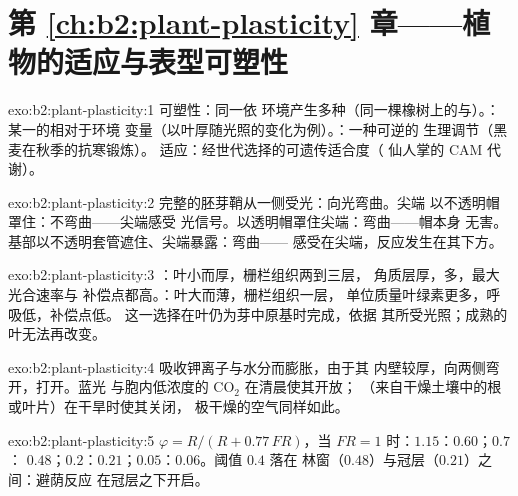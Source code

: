 \section*{第 \ref{ch:b2:plant-plasticity} 章——植物的适应与表型可塑性}

\begin{solution}{exo:b2:plant-plasticity:1}
可塑性：同一依
环境产生多种（同一棵橡树上的与）。：
某一的相对于环境
变量（以叶厚随光照的变化为例）。：一种可逆的
生理调节（黑麦在秋季的抗寒锻炼）。
适应：经世代选择的可遗传适合度（
仙人掌的 CAM 代谢）。
\end{solution}

\begin{solution}{exo:b2:plant-plasticity:2}
完整的胚芽鞘从一侧受光：向光弯曲。尖端
以不透明帽罩住：不弯曲——尖端感受
光信号。以透明帽罩住尖端：弯曲——帽本身
无害。基部以不透明套管遮住、尖端暴露：弯曲——
感受在尖端，反应发生在其下方。
\end{solution}

\begin{solution}{exo:b2:plant-plasticity:3}
：叶小而厚，栅栏组织两到三层，
角质层厚，多，最大光合速率与
补偿点都高。：叶大而薄，栅栏组织一层，
单位质量叶绿素更多，呼吸低，补偿点低。
这一选择在叶仍为芽中原基时完成，依据
其所受光照；成熟的叶无法再改变。
\end{solution}

\begin{solution}{exo:b2:plant-plasticity:4}
吸收钾离子与水分而膨胀，由于其
内壁较厚，向两侧弯开，打开。蓝光
与胞内低浓度的 $\mathrm{CO_2}$ 在清晨使其开放；
（来自干燥土壤中的根或叶片）在干旱时使其关闭，
极干燥的空气同样如此。
\end{solution}

\begin{solution}{exo:b2:plant-plasticity:5}
$\varphi = R/(R + 0.77\,FR)$，当 $FR = 1$ 时：$1.15$：$0.60$；$0.7$：
$0.48$；$0.2$：$0.21$；$0.05$：$0.06$。阈值 $0.4$ 落在
林窗（$0.48$）与冠层（$0.21$）之间：避荫反应
在冠层之下开启。
\end{solution}


